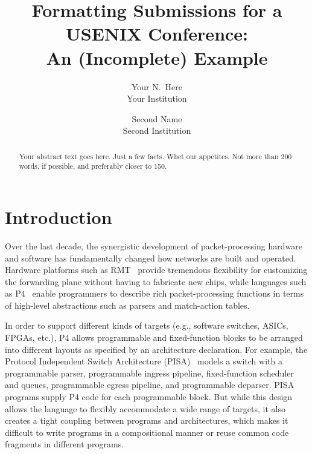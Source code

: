 \title{\Large \bf Formatting Submissions for a USENIX Conference:\\
  An (Incomplete) Example}

\author{
{\rm Your N.\ Here}\\
Your Institution
\and
{\rm Second Name}\\
Second Institution
} %

\maketitle

\begin{abstract}
Your abstract text goes here. Just a few facts. Whet our appetites.
Not more than 200 words, if possible, and preferably closer to 150.
\end{abstract}


\section{Introduction}

Over the last decade, the synergistic development of packet-processing
hardware and software has fundamentally changed how networks are built
and operated. Hardware platforms such as
RMT~\cite{Bosshart:2013:FMF:2486001.2486011} provide tremendous
flexibility for customizing the forwarding plane without having to
fabricate new chips, while languages such as
P4~\cite{Bosshart:2014:PPP:2656877.2656890, p4lang} enable programmers
to describe rich packet-processing functions in terms of high-level
abstractions such as parsers and match-action tables.

In order to support different kinds of targets (e.g., software
switches, ASICs, FPGAs, etc.), P4 allows programmable and
fixed-function blocks to be arranged into different layouts as
specified by an architecture declaration. For example, the Protocol
Independent Switch Architecture
(PISA)~\cite{Bosshart:2013:FMF:2486001.2486011} models a switch with a
programmable parser, programmable ingress pipeline, fixed-function
scheduler and queues, programmable egress pipeline, and programmable
deparser. PISA programs supply P4 code for each programmable block.
But while this design allows the language to flexibly accommodate a
wide range of targets, it also creates a tight coupling between
programs and architectures, which makes it difficult to write programs
in a compositional manner or reuse common code fragments in different
programs.


